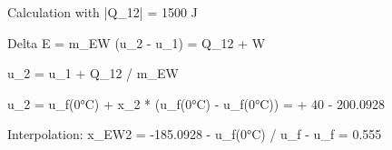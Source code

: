 Calculation with |Q_12| = 1500 J  

Delta E = m_EW (u_2 - u_1) = Q_12 + W  

u_2 = u_1 + Q_12 / m_EW  

u_2 = u_f(0°C) + x_2 * (u_f(0°C) - u_f(0°C)) = + 40 - 200.0928  

Interpolation:  
x_EW2 = -185.0928 - u_f(0°C) / u_f - u_f = 0.555